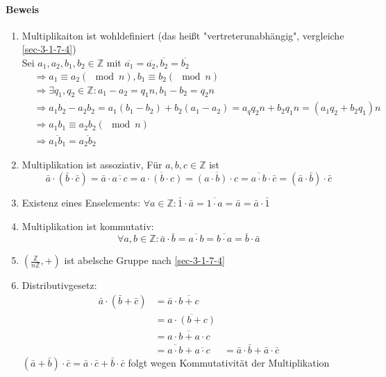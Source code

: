 \documentclass[a4paper]{scrartcl}
\DeclareMathOperator{\Forall}{\forall}
\theoremstyle{definition}
\theoremstyle{plain}
\theoremstyle{plain}
\theoremstyle{remark}
\theoremstyle{remark}
\theoremstyle{remark}
\begin{document}
\paragraph{Beweis}
\label{sec-3-2-4-1}
\begin{enumerate}
\item Multiplikaiton ist wohldefiniert (das heißt "vertreterunabhängig", vergleiche \ref{sec-3-1-7-4}) \\
        Sei $a_1,a_2,b_1,b_2 \in\mathbb{Z}$ mit $\overline{a_1} = \overline{a_2},\overline{b_2} = \overline{b_2}$
\begin{align}
&\Rightarrow a_1 \equiv a_2 (\mod n), b_1\equiv b_2 (\mod n) \\
&\Rightarrow \exists q_1,q_2\in\mathbb{Z}:a_1 - a_2 = q_1 n, b_1 - b_2 = q_2 n \\
&\Rightarrow a_1 b_2 - a_2 b_2 = a_1(b_1 - b_2) + b_2 (a_1 - a_2) = a_q q_2 n + b_2 q_1 n = (a_1 q_2 + b_2 q_1) n \\
&\Rightarrow a_1 b_1 \equiv a_2 b_2 (\mod n) \\
&\Rightarrow \overline{a_1 b_1} = \overline{a_2 b_2}
\end{align}
\item Multiplikation ist assoziativ, Für $a,b,c\in\mathbb{Z}$ ist
\[\bar a\cdot (\bar b\cdot \bar c) = \bar a \cdot \overline{a\cdot c} = \overline{a\cdot(b\cdot c)} = \overline{(a\cdot b)\cdot c} = \overline{a\cdot b} \cdot \bar c = (\bar a\cdot \bar b) \cdot \bar c\]
\item Existenz eines Enselements: $\Forall a\in\mathbb{Z}:\bar 1 \cdot \bar a = \overline{1\cdot a} = \bar a = \bar a\cdot \bar 1$
\item Multiplikation ist kommutativ:
\[\Forall a,b\in\mathbb{Z}:\bar a\cdot \bar b = \overline{a\cdot b} = \overline{b\cdot a} = \bar b \cdot \bar a\]
\item $(\frac{\mathbb{Z}}{n\mathbb{Z}},+)$ ist abelsche Gruppe nach \ref{sec-3-1-7-4}
\item Distributivgesetz:
\begin{align}
\bar a\cdot (\bar b + \bar c) &= \bar a \cdot \overline{b + c} \\
&= \overline{a\cdot (b + c)} \\
&= \overline{a\cdot b + a\cdot c} \\
&= \overline{a\cdot b} + \overline{a\cdot c}
&= \bar a\cdot \bar b + \bar a \cdot\bar c
\end{align}
$(\bar a + \bar b)\cdot \bar c = \bar a\cdot \bar c + \bar b \cdot \bar c$ folgt wegen Kommutativität der Multiplikation
\end{enumerate}
\end{document}

